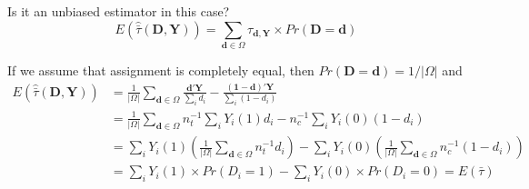 \documentclass[notes,11pt, aspectratio=169]{beamer}
\newenvironment{wideitemize}{\itemize\addtolength{\itemsep}{10pt}}{\enditemize}
\begin{document}
\begin{frame}
  
  \begin{wideitemize}
      \item Is it an unbiased estimator in this case?
      \begin{equation}
        E(\hat{\bar{\tau}}(\mathbf{D}, \mathbf{Y})) = \sum_{\mathbf{d} \in \Omega} \tau_{\mathbf{d}, \mathbf{Y}} \times Pr(\mathbf{D} = \mathbf{d})
      \end{equation}
    \item If we assume that assignment is completely equal, then
      $Pr(\mathbf{D} = \mathbf{d}) = 1/ |\Omega|$ and
      \begin{align*}
        E(\hat{\bar{\tau}}(\mathbf{D}, \mathbf{Y})) &= \frac{1}{|\Omega|}\sum_{\mathbf{d} \in \Omega} \frac{\mathbf{d}'\mathbf{Y}}{\sum_{i}d_{i}} - \frac{(\mathbf{1}-\mathbf{d})'\mathbf{Y}}{\sum_{i}(1-d_{i})}\\
                                                    &= \frac{1}{|\Omega|}\sum_{\mathbf{d} \in \Omega} n^{-1}_{t}\sum_{i}Y_{i}(1)d_{i} - n^{-1}_{c}\sum_{i}Y_{i}(0)(1-d_{i})\\
                                                    &= \sum_{i}Y_{i}(1)\left(\frac{1}{|\Omega|}\sum_{\mathbf{d} \in \Omega} n^{-1}_{t}d_{i}\right) -  \sum_{i}Y_{i}(0)\left(\frac{1}{|\Omega|}\sum_{\mathbf{d} \in \Omega}n^{-1}_{c}(1-d_{i})\right)\\
                                                                                                          &= \sum_{i}Y_{i}(1)\times Pr(D_{i} = 1) -  \sum_{i}Y_{i}(0)\times Pr(D_{i} = 0)         = E(\bar{\tau})                                             
      \end{align*}
    \end{wideitemize}

\end{frame}
\end{document}
